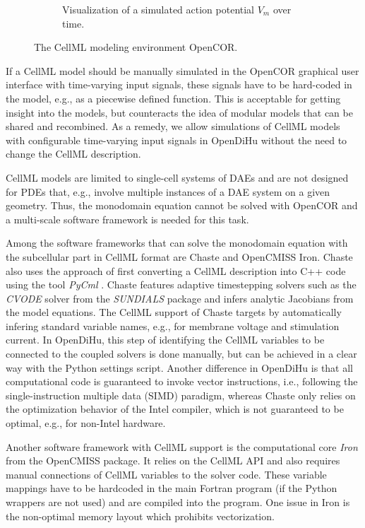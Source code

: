 \begin{figure}
\begin{subfigure}[t]{0.45\textwidth}
    \caption{Visualization of a simulated action potential $V_m$ over time.}%
    \label{fig:opencor2}%
  \end{subfigure}
  \caption{The CellML modeling environment OpenCOR.}%
  \label{fig:opencor}%
\end{figure}%

If a CellML model should be manually simulated in the OpenCOR graphical user interface with time-varying input signals, these signals have to be hard-coded in the model, e.g., as a piecewise defined function. This is acceptable for getting insight into the models, but counteracts the idea of modular models that can be shared and recombined. 
As a remedy, we allow simulations of CellML models with configurable time-varying input signals in OpenDiHu without the need to change the CellML description.

CellML models are limited to single-cell systems of DAEs and are not designed for PDEs that, e.g., involve multiple instances of a DAE system on a given geometry. Thus, the monodomain equation cannot be solved with OpenCOR and a multi-scale software framework is needed for this task.

Among the software frameworks that can solve the monodomain equation with the subcellular part in CellML format are Chaste and OpenCMISS Iron.
Chaste \cite{ChasteCellML2015} also uses the approach of first converting a CellML description into C++ code using the tool \emph{PyCml} \cite{Cooper2006}. Chaste features adaptive timestepping solvers such as the \emph{CVODE} solver from the \emph{SUNDIALS} package \cite{cohen1996cvode} and infers analytic Jacobians from the model equations. The CellML support of Chaste targets  by automatically infering standard variable names, e.g., for membrane voltage and stimulation current.
In OpenDiHu, this step of identifying the CellML variables to be connected to the coupled solvers is done manually, but can be achieved in a clear way with the Python settings script. Another difference in OpenDiHu is that all computational code is guaranteed to invoke vector instructions, i.e., following the single-instruction multiple data (SIMD) paradigm, whereas Chaste only relies on the optimization behavior of the Intel compiler, which is not guaranteed to be optimal, e.g., for non-Intel hardware.

Another software framework with CellML support is the computational core \emph{Iron} from the OpenCMISS package. It relies on the CellML API and also requires manual connections of CellML variables to the solver code. These variable mappings have to be hardcoded in the main Fortran program (if the Python wrappers are not used) and are compiled into the program. One issue in Iron is the non-optimal memory layout which prohibits vectorization. 

